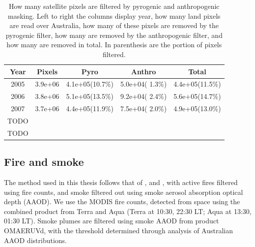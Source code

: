       \begin{table}
        \caption{How many satellite pixels are filtered by pyrogenic and anthropogenic masking. Left to right the columns display year, how many land pixels are read over Australia, how many of these pixels are removed by the pyrogenic filter, how many are removed by the anthropogenic filter, and how many are removed in total. In parenthesis are the portion of pixels filtered.}
        \begin{tabular}{ c c c c c }
          \textbf{Year} & \textbf{Pixels} & \textbf{Pyro} & \textbf{Anthro} & \textbf{Total} 
          \\ \hline
          2005   &  3.9e+06    &  4.1e+05(10.7\%)     &    5.0e+04( 1.3\%)    &    4.4e+05(11.5\%) \\
          2006   &  3.8e+06    &  5.1e+05(13.5\%)     &    9.2e+04( 2.4\%)    &    5.6e+05(14.7\%) \\
          2007   &  3.7e+06    &  4.4e+05(11.9\%)     &    7.5e+04( 2.0\%)    &    4.9e+05(13.0\%) \\
          TODO &  &  &  \\
          TODO &  &  &  \\
        \end{tabular}
        \label{Model:Filter:tab_summary_pixels_masked}
      \end{table}
  
  
  
  \subsection{Fire and smoke}
    \label{Model:Filter:fire}
    
    
    The method used in this thesis follows that of \textcite{Marais2012}, and \textcite{Barkley2013}, with active fires filtered using fire counts, and smoke filtered out using smoke aerosol absorption optical depth (AAOD).
    We use the MODIS fire counts, detected from space using the combined product from Terra and Aqua (Terra at 10:30, 22:30 LT; Aqua at 13:30, 01:30 LT).
    Smoke plumes are filtered using smoke AAOD from product OMAERUVd, with the threshold determined through analysis of Australian AAOD distributions.
    
